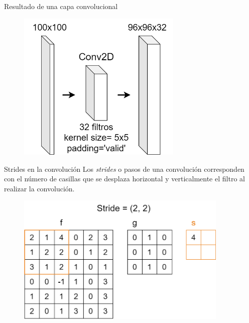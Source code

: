 \begin{frame}{Resultado de una capa convolucional}
\begin{figure}
    \centering
    \includegraphics[width=0.7\textwidth]{figures/Tema 3/ConvDimensions_5.png}
\end{figure}
\end{frame}

\begin{frame}{Strides en la convolución}
Los \alert{\textit{strides}} o pasos de una convolución corresponden con el número de casillas que se desplaza \alert{horizontal} y \alert{verticalmente} el filtro al realizar la convolución.

\begin{figure}
    \centering
    \includegraphics[width=0.9\textwidth]{figures/Tema 2/Strides2x2_2.png}
\end{figure}
\end{frame}

